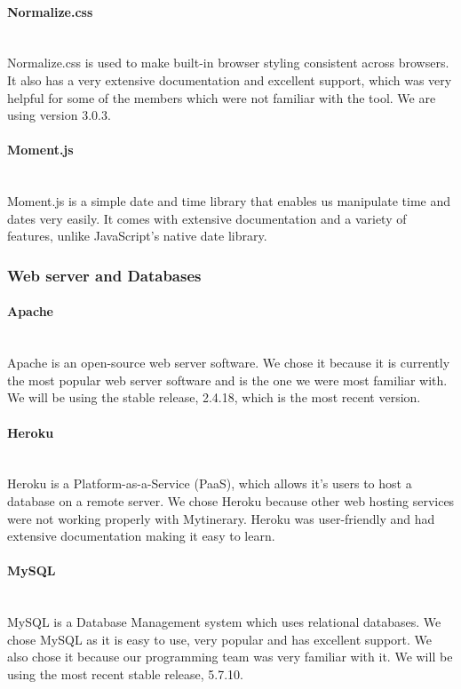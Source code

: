 \documentclass[12pt]{article}
\begin{document}
\paragraph*{Normalize.css}~\\
Normalize.css is used to make built-in browser styling consistent across browsers. It also has a very extensive documentation and excellent support, which was very helpful for some of the members which were not familiar with the tool. We are using version 3.0.3.
%
\paragraph*{Moment.js}~\\
Moment.js is a simple date and time library that enables us manipulate time and dates very easily. It comes with extensive documentation and a variety of features, unlike JavaScript's native date library.
%
%
%
\subsubsection{Web server and Databases} \label{webanddata}
\paragraph*{Apache}~\\
Apache is an open-source web server software. We chose it because it is currently the most popular web server software and is the one we were most familiar with. We will be using the stable release, 2.4.18, which is the most recent version.
%
\paragraph*{Heroku}~\\
Heroku is a Platform-as-a-Service (PaaS), which allows it's users to host a database on a remote server. We chose Heroku because other web hosting services were not working properly with Mytinerary. Heroku was user-friendly and had extensive documentation making it easy to learn.
%
\paragraph*{MySQL}~\\
MySQL is a Database Management system which uses relational databases. We chose MySQL as it is easy to use, very popular and has excellent support. We also chose it because our programming team was very familiar with it. We will be using the most recent stable release, 5.7.10.
%
\end{document}
